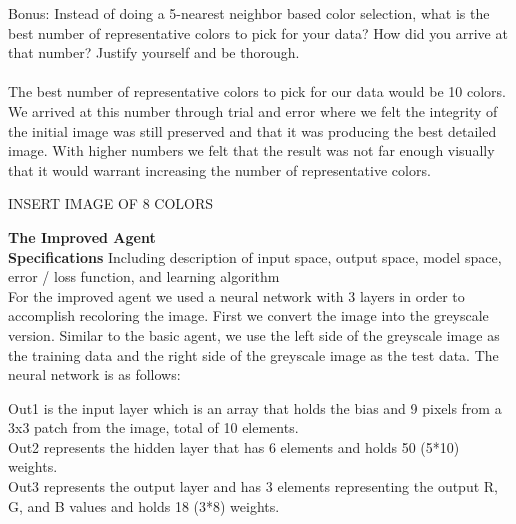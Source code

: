 \documentclass{article}
\theoremstyle{definition}
\begin{document}
 Bonus: Instead of doing a 5-nearest neighbor based color selection, what is the best number of representative colors to pick for your data? How did you arrive at that number? Justify yourself and be thorough. \\\\
 The best number of representative colors to pick for our data would be 10 colors. We arrived at this number through trial and error where we felt the integrity of the initial image was still preserved and that it was producing the best detailed image. With higher numbers we felt that the result was not far enough visually that it would warrant increasing the number of representative colors. 
 
 INSERT IMAGE OF 8 COLORS

\textbf{\Large The Improved Agent} \\

	\textbf{Specifications}
	    Including description of input space, output space, model space, error / loss function, and learning algorithm \\
        For the improved agent we used a neural network with 3 layers in order to accomplish recoloring the image. First we convert the image into the greyscale version. Similar to the basic agent, we use the left side of the greyscale image as the training data and the right side of the greyscale image as the test data.
        The neural network is as follows: \\

        \begin{figure}[H]
            \centering
        \end{figure}
                
        Out1 is the input layer which is an array that holds the bias and 9 pixels from a 3x3 patch from the image, total of 10 elements. \\
        Out2 represents the hidden layer that has 6 elements and holds 50 (5*10) weights. \\
        Out3 represents the output layer and has 3 elements representing the output R, G, and B values and holds 18 (3*8) weights. \\
        
\end{document}
